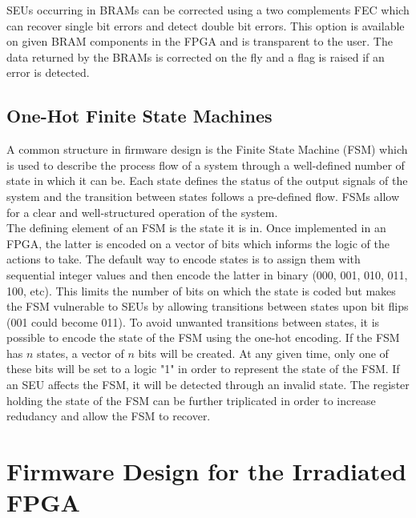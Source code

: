       SEUs occurring in BRAMs can be corrected using a two complements FEC which can recover single bit errors and detect double bit errors. This option is available on given BRAM components in the FPGA and is transparent to the user. The data returned by the BRAMs is corrected on the fly and a flag is raised if an error is detected.

    \subsection{One-Hot Finite State Machines}

      A common structure in firmware design is the Finite State Machine (FSM) which is used to describe the process flow of a system through a well-defined number of state in which it can be. Each state defines the status of the output signals of the system and the transition between states follows a pre-defined flow. FSMs allow for a clear and well-structured operation of the system. \\

      The defining element of an FSM is the state it is in. Once implemented in an FPGA, the latter is encoded on a vector of bits which informs the logic of the actions to take. The default way to encode states is to assign them with sequential integer values and then encode the latter in binary (000, 001, 010, 011, 100, etc). This limits the number of bits on which the state is coded but makes the FSM vulnerable to SEUs by allowing transitions between states upon bit flips (001 could become 011). To avoid unwanted transitions between states, it is possible to encode the state of the FSM using the one-hot encoding. If the FSM has $n$ states, a vector of $n$ bits will be created. At any given time, only one of these bits will be set to a logic "1" in order to represent the state of the FSM. If an SEU affects the FSM, it will be detected through an invalid state. The register holding the state of the FSM can be further triplicated in order to increase redudancy and allow the FSM to recover.

  \section{Firmware Design for the Irradiated FPGA}


